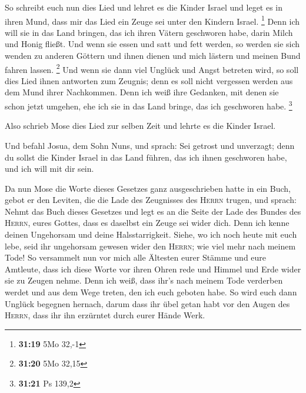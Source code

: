  So schreibt euch nun dies Lied und lehret es die Kinder
Israel und leget es in ihren Mund, dass mir das Lied ein Zeuge sei unter
den Kindern Israel. \footnote{\textbf{31:19} 5Mo 32,-1} 
Denn ich will sie in das Land bringen, das ich ihren Vätern geschworen
habe, darin Milch und Honig fließt. Und wenn sie essen und satt und fett
werden, so werden sie sich wenden zu anderen Göttern und ihnen dienen
und mich lästern und meinen Bund fahren lassen. \footnote{\textbf{31:20}
  5Mo 32,15}  Und wenn sie dann viel Unglück und Angst
betreten wird, so soll dies Lied ihnen antworten zum Zeugnis; denn es
soll nicht vergessen werden aus dem Mund ihrer Nachkommen. Denn ich weiß
ihre Gedanken, mit denen sie schon jetzt umgehen, ehe ich sie in das
Land bringe, das ich geschworen habe. \footnote{\textbf{31:21} Ps 139,2}

 Also schrieb Mose dies Lied zur selben Zeit und lehrte
es die Kinder Israel.

 Und befahl Josua, dem Sohn Nuns, und sprach: Sei getrost
und unverzagt; denn du sollst die Kinder Israel in das Land führen, das
ich ihnen geschworen habe, und ich will mit dir sein.

 Da nun Mose die Worte dieses Gesetzes ganz
ausgeschrieben hatte in ein Buch,  gebot er den Leviten,
die die Lade des Zeugnisses des \textsc{Herrn} trugen, und sprach:
 Nehmt das Buch dieses Gesetzes und legt es an die Seite
der Lade des Bundes des \textsc{Herrn}, eures Gottes, dass es daselbst
ein Zeuge sei wider dich.  Denn ich kenne deinen
Ungehorsam und deine Halsstarrigkeit. Siehe, wo ich noch heute mit euch
lebe, seid ihr ungehorsam gewesen wider den \textsc{Herrn}; wie viel
mehr nach meinem Tode!  So versammelt nun vor mich alle
Ältesten eurer Stämme und eure Amtleute, dass ich diese Worte vor ihren
Ohren rede und Himmel und Erde wider sie zu Zeugen nehme.
 Denn ich weiß, dass ihr's nach meinem Tode verderben
werdet und aus dem Wege treten, den ich euch geboten habe. So wird euch
dann Unglück begegnen hernach, darum dass ihr übel getan habt vor den
Augen des \textsc{Herrn}, dass ihr ihn erzürntet durch eurer Hände Werk.

